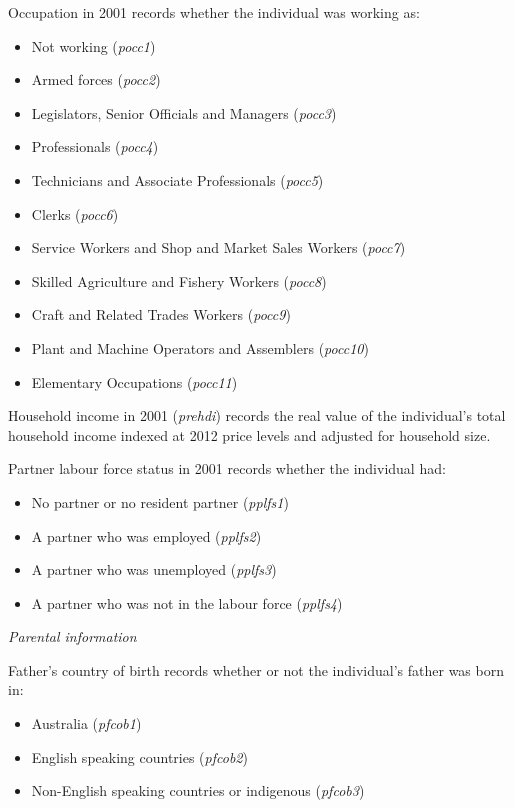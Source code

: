 \documentclass[12pt, a4paper]{article}
\begin{document}
Occupation in 2001 records whether the individual was working as:
\begin{itemize}
  \item Not working (\textit{p\textunderscore{}occ1})
  \item Armed forces (\textit{p\textunderscore{}occ2})
  \item Legislators, Senior Officials and Managers (\textit{p\textunderscore{}occ3})
  \item Professionals (\textit{p\textunderscore{}occ4})
  \item Technicians and Associate Professionals (\textit{p\textunderscore{}occ5})
  \item Clerks (\textit{p\textunderscore{}occ6})
  \item Service Workers and Shop and Market Sales Workers (\textit{p\textunderscore{}occ7})
  \item Skilled Agriculture and Fishery Workers (\textit{p\textunderscore{}occ8})
  \item Craft and Related Trades Workers (\textit{p\textunderscore{}occ9})
  \item Plant and Machine Operators and Assemblers (\textit{p\textunderscore{}occ10})
  \item Elementary Occupations (\textit{p\textunderscore{}occ11})
\end{itemize}  
  
Household income in 2001 (\textit{p\textunderscore{}rehdi}) records the real value of the individual’s total household income indexed at 2012 price levels and adjusted for household size.
 
Partner labour force status in 2001 records whether the individual had:
\begin{itemize}
  \item No partner or no resident partner (\textit{p\textunderscore{}plfs1})
  \item A partner who was employed (\textit{p\textunderscore{}plfs2})
  \item A partner who was unemployed (\textit{p\textunderscore{}plfs3})
  \item A partner who was not in the labour force (\textit{p\textunderscore{}plfs4})
\end{itemize}  
  
\emph{Parental information}

Father’s country of birth records whether or not the individual’s father was born in:
\begin{itemize}
  \item Australia (\textit{p\textunderscore{}fcob1}) 
  \item English speaking countries (\textit{p\textunderscore{}fcob2})
  \item Non-English speaking countries or indigenous (\textit{p\textunderscore{}fcob3})
\end{itemize}  
 
\end{document}
